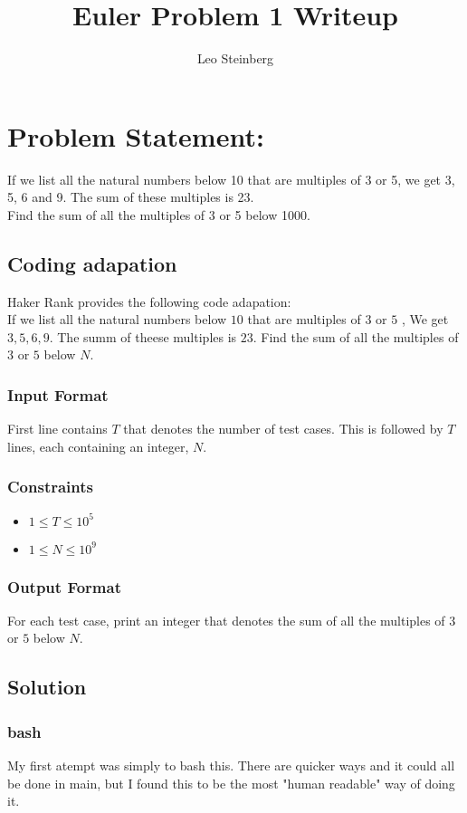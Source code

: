 \documentclass[12pt]{article}
\title{Euler Problem 1 Writeup}
\author{Leo Steinberg}
\begin{document}
\maketitle


\section{Problem Statement:}
If we list all the natural numbers below 10 that are multiples of 3 or 5, we get 3, 5, 6 and 9. The sum of these multiples is 23.
\\
Find the sum of all the multiples of 3 or 5 below 1000.
\subsection{Coding adapation}
Haker Rank provides the following code adapation: \\

If we list all the natural numbers below $10$ that are multiples of $3$ or $5$ , We get $3, 5, 6, 9$. The summ of theese multiples is $23$. Find the sum of all the multiples of $3$ or $5$ below $N$.
\subsubsection*{Input Format}
First line contains $T$ that denotes the number of test cases. This is followed by $T$ lines, each containing an integer, $N$.
\subsubsection*{Constraints}
\begin{itemize}
\item $1 \leq T \leq 10^{5} $
\item $1 \leq N \leq 10^{9} $
 \end{itemize}

\subsubsection*{Output Format}
For each test case, print an integer that denotes the sum of all the multiples of $3$ or $5$ below $N$.

\subsection{Solution}

\subsubsection{bash}
My first atempt was simply to bash this. There are quicker ways and it could all be done in main, but I found this to be the most "human readable" way of doing it.
\end{document}
